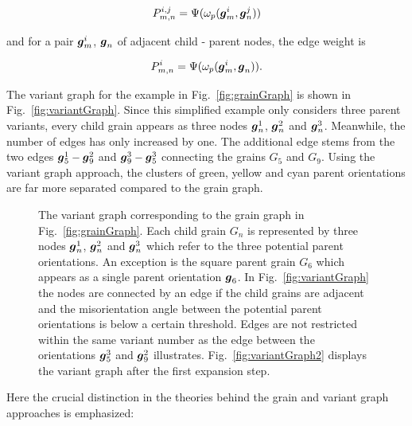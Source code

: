 \documentclass{elsarticle}
\renewcommand{\vec}[1]{\ensuremath \mathbf{\boldsymbol{#1}}}
\numberwithin{equation}{section}
\begin{document}
\begin{equation*}
  P_{m,n}^{i,j} = \Psi(\omega_p(\vec g_m^i, \vec g_n^j))   
\end{equation*}

and for a pair $\vec g_m^i$, $\vec g_{n}$ of adjacent child - parent nodes, the edge weight is

\begin{equation*}
  P_{m,n}^{i} = \Psi(\omega_p(\vec g_m^i, \vec g_n)).   
\end{equation*}

The variant graph for the example in Fig.~\ref{fig:grainGraph} is shown in Fig.~\ref{fig:variantGraph}. Since this simplified example only considers three parent variants, every child grain appears as three nodes $\vec g_n^1$, $\vec g_n^2$ and $\vec g_n^3$. Meanwhile, the number of edges has only increased by one. The additional edge stems from the two edges $\vec g_5^1 - \vec g_9^2$ and $\vec g_9^3 - \vec g_5^3$ connecting the grains $G_5$ and $G_9$. Using the variant graph approach, the clusters of green, yellow and cyan parent orientations are far more separated compared to the grain graph.

\begin{figure}
    \centering
    \caption{The variant graph corresponding to the grain graph in Fig.~\ref{fig:grainGraph}. Each child grain $G_n$ is represented by three nodes $\vec g_n^1$, $\vec g_n^2$ and $\vec g_n^3$ which refer to the three potential parent orientations. An exception is the square parent grain $G_6$ which appears as a single parent orientation $\vec g_6$. In Fig.~\ref{fig:variantGraph} the nodes are connected by an edge if the child grains are adjacent and the misorientation angle between the potential parent orientations is below a certain threshold. Edges are not restricted within the same variant number as the edge between the orientations $\vec g_5^3$ and $\vec g_9^2$ illustrates. Fig.~\ref{fig:variantGraph2} displays the variant graph after the first expansion step.}
\end{figure}

Here the crucial distinction in the theories behind the grain and variant graph approaches is emphasized:
\end{document}
